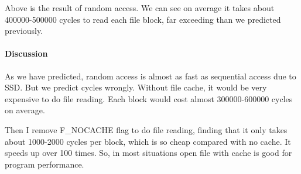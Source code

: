Above is the result of random access. We can see on average it takes about 400000-500000 cycles to read each file block, far exceeding than we predicted previously.

\paragraph{Discussion}
As we have predicted, random access is almost as fast as sequential access due to SSD. But we predict cycles wrongly. Without file cache, it would be very expensive to do file reading. Each block would cost almost 300000-600000 cycles on average.

Then I remove F\_NOCACHE flag to do file reading, finding that it only takes about 1000-2000 cycles per block, which is so cheap compared with no cache. It speeds up over 100 times. So, in most situations open file with cache is good for program performance.
